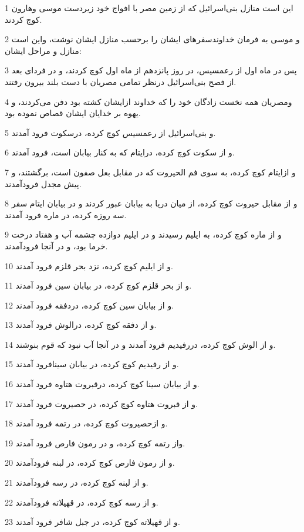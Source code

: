 \par 1 این است منازل بنی‌اسرائیل که از زمین مصر با افواج خود زیردست موسی وهارون کوچ کردند.
\par 2 و موسی به فرمان خداوندسفرهای ایشان را برحسب منازل ایشان نوشت، واین است منازل و مراحل ایشان:
\par 3 پس در ماه اول از رعمسیس، در روز پانزدهم از ماه اول کوچ کردند، و در فردای بعد از فصح بنی‌اسرائیل درنظر تمامی مصریان با دست بلند بیرون رفتند.
\par 4 ومصریان همه نخست زادگان خود را که خداوند ازایشان کشته بود دفن می‌کردند، و یهوه بر خدایان ایشان قصاص نموده بود.
\par 5 و بنی‌اسرائیل از رعمسیس کوچ کرده، درسکوت فرود آمدند.
\par 6 و از سکوت کوچ کرده، درایتام که به کنار بیابان است، فرود آمدند.
\par 7 و ازایتام کوچ کرده، به سوی فم الحیروت که در مقابل بعل صفون است، برگشتند، و پیش مجدل فرودآمدند.
\par 8 و از مقابل حیروت کوچ کرده، از میان دریا به بیابان عبور کردند و در بیابان ایتام سفر سه روزه کرده، در ماره فرود آمدند.
\par 9 و از ماره کوچ کرده، به ایلیم رسیدند و در ایلیم دوازده چشمه آب و هفتاد درخت خرما بود، و در آنجا فرودآمدند.
\par 10 و از ایلیم کوچ کرده، نزد بحر قلزم فرود آمدند.
\par 11 و از بحر قلزم کوچ کرده، در بیابان سین فرود آمدند.
\par 12 و از بیابان سین کوچ کرده، دردفقه فرود آمدند.
\par 13 و از دفقه کوچ کرده، درالوش فرود آمدند.
\par 14 و از الوش کوچ کرده، دررفیدیم فرود آمدند و در آنجا آب نبود که قوم بنوشند.
\par 15 و از رفیدیم کوچ کرده، در بیابان سینافرود آمدند.
\par 16 و از بیابان سینا کوچ کرده، درقبروت هتاوه فرود آمدند.
\par 17 و از قبروت هتاوه کوچ کرده، در حصیروت فرود آمدند.
\par 18 و ازحصیروت کوچ کرده، در رتمه فرود آمدند.
\par 19 واز رتمه کوچ کرده، و در رمون فارص فرود آمدند.
\par 20 و از رمون فارص کوچ کرده، در لبنه فرودآمدند.
\par 21 و از لبنه کوچ کرده، در رسه فرودآمدند.
\par 22 و از رسه کوچ کرده، در قهیلاته فرودآمدند.
\par 23 و از قهیلاته کوچ کرده، در جبل شافر فرود آمدند.
